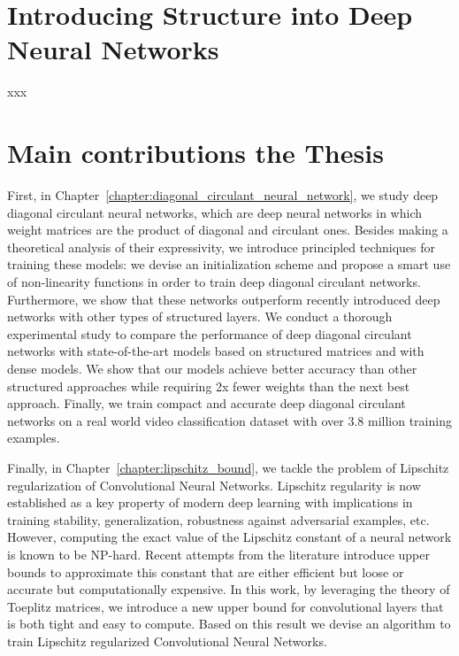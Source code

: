 \section{Introducing Structure into Deep Neural Networks}

xxx







\section{Main contributions the Thesis}

First, in Chapter~\ref{chapter:diagonal_circulant_neural_network}, we study deep diagonal circulant neural networks, which are deep neural networks in which weight matrices are the product of diagonal and circulant ones.
Besides making a theoretical analysis of their expressivity, we introduce principled techniques for training these models: we devise an initialization scheme and propose a smart use of non-linearity functions in order to train deep diagonal circulant networks. 
Furthermore, we show that these networks outperform recently introduced deep networks with other types of structured layers. We conduct a thorough experimental study to compare the performance of deep diagonal circulant networks with state-of-the-art models based on structured matrices and with dense models. We show that our models achieve better accuracy than other structured approaches while requiring 2x fewer weights than the next best approach. Finally, we train compact and accurate deep diagonal circulant networks on a real world video classification dataset with over 3.8 million training examples. 


Finally, in Chapter~\ref{chapter:lipschitz_bound}, we tackle the problem of Lipschitz regularization of Convolutional Neural Networks.
Lipschitz regularity is now established as a key property of modern deep learning with implications in training stability, generalization, robustness against adversarial examples, etc.
However, computing the exact value of the Lipschitz constant of a neural network is known to be NP-hard.
Recent attempts from the literature introduce upper bounds to approximate this constant that are either efficient but loose or accurate but computationally expensive.
In this work, by leveraging the theory of Toeplitz matrices, we introduce a new upper bound for convolutional layers that is both tight and easy to compute.
Based on this result we devise an algorithm to train Lipschitz regularized Convolutional Neural Networks.


